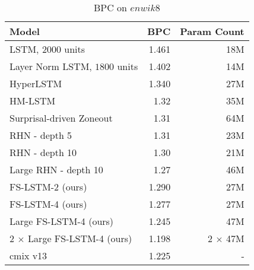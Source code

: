 \documentclass{article}
\begin{document}
\begin{table}
\caption{BPC on $enwik8$}
\label{table: enwik8}
\renewcommand{\arraystretch}{1.1}
\begin{center}
 \begin{tabular}{@{} lrr @{}} 
 \toprule[1.5pt]
 Model & BPC & Param Count \\ 
 \midrule
 LSTM, $2000$ units & 1.461 & 18M \\
 Layer Norm LSTM, $1800$ units & 1.402 & 14M\\
 HyperLSTM \cite{ha2016hyper} & 1.340 & 27M \\  
 HM-LSTM \cite{chung2016multiscale}& 1.32 & 35M \\
 Surprisal-driven Zoneout \cite{rocki2016surprisal} & 1.31 & 64M \\
 RHN - depth 5 \cite{zilly2016recurrent}& 1.31 & 23M \\
 RHN - depth 10  \cite{zilly2016recurrent}& 1.30 & 21M \\
 Large RHN - depth 10  \cite{zilly2016recurrent}& 1.27 & 46M \\
 \midrule
 FS-LSTM-2 (ours) & 1.290 & 27M \\
 FS-LSTM-4 (ours) & 1.277 & 27M \\
 Large FS-LSTM-4 (ours) & 1.245 & 47M \\
 2 $\times$ Large FS-LSTM-4 (ours) & 1.198 & 2 $\times$ 47M \\
 \midrule
 cmix v13 \cite{cmix}  & 1.225 & - \\
 \bottomrule[1.5pt]
\end{tabular}
\end{center}
\end{table}
\end{document}
